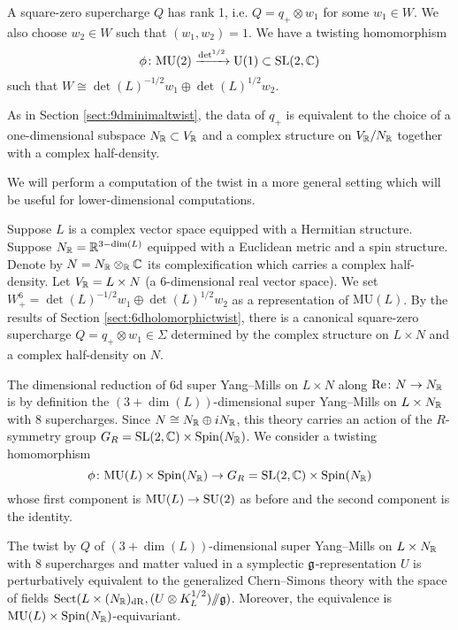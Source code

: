 \documentclass[10pt, oneside]{article}
\newcommand{\MU}{\mathrm{MU}}
\renewcommand{\Re}{\mathrm{Re}}
\newcommand{\Sect}{\mathrm{Sect}}
\renewcommand{\U}{\mathrm{U}}
\newcommand{\ham}{/\!\!/}
\begin{document}
A square-zero supercharge $Q$ has rank 1, i.e. $Q=q_+\otimes w_1$ for some $w_1\in W$. We also choose $w_2\in W$ such that $(w_1, w_2) = 1$. We have a twisting homomorphism
\[\phi\colon\MU(2)\xrightarrow{\det^{1/2}}\U(1)\subset \SL(2, \CC)\]
such that $W\cong \det(L)^{-1/2} w_1\oplus \det(L)^{1/2} w_2$.

As in Section \ref{sect:9dminimaltwist}, the data of $q_+$ is equivalent to the choice of a one-dimensional subspace $N_\mathbb R\subset V_\mathbb R$ and a complex structure on $V_\mathbb R/N_\mathbb R$ together with a complex half-density.

We will perform a computation of the twist in a more general setting which will be useful for lower-dimensional computations.

Suppose $L$ is a complex vector space equipped with a Hermitian structure. Suppose $N_\mathbb R=\mathbb R^{3-\dim(L)}$ equipped with a Euclidean metric and a spin structure. Denote by $N=N_\mathbb R\otimes_\mathbb R\mathbb C$ its complexification which carries a complex half-density. Let $V_\mathbb R=L\times N$ (a 6-dimensional real vector space). We set $W^6_+=\det(L)^{-1/2}w_1\oplus \det(L)^{1/2} w_2$ as a representation of $\MU(L)$. By the results of Section \ref{sect:6dholomorphictwist}, there is a canonical square-zero supercharge $Q=q_+\otimes w_1\in\Sigma$ determined by the complex structure on $L\times N$ and a complex half-density on $N$.

The dimensional reduction of 6d super Yang--Mills on $L\times N$ along $\Re\colon N\rightarrow N_\RR$ is by definition the $(3+\dim(L))$-dimensional super Yang--Mills on $L\times N_\mathbb R$ with 8 supercharges. Since $N\cong N_\mathbb R\oplus iN_\mathbb R$, this theory carries an action of the $R$-symmetry group $G_R=\mathrm{SL}(2, \mathbb C)\times \mathrm{Spin}(N_\mathbb R)$. We consider a twisting homomorphism
\[\phi\colon \MU(L)\times \Spin(N_\RR)\rightarrow G_R=\SL(2, \CC)\times \Spin(N_\RR)\]
whose first component is $\MU(L)\rightarrow \SU(2)$ as before and the second component is the identity.

\begin{theorem}
The twist by $Q$ of $(3+\dim(L))$-dimensional super Yang--Mills on $L\times N_\mathbb R$ with 8 supercharges and matter valued in a symplectic $\mathfrak g$-representation $U$ is perturbatively equivalent to the generalized Chern--Simons theory with the space of fields $\Sect(L\times (N_\RR)_{\mr{dR}}, (U\otimes K_L^{1/2})\ham \fg)$. Moreover, the equivalence is $\MU(L)\times \Spin(N_\RR)$-equivariant.
\label{thm:6dCSreduction}
\end{theorem}
\end{document}
